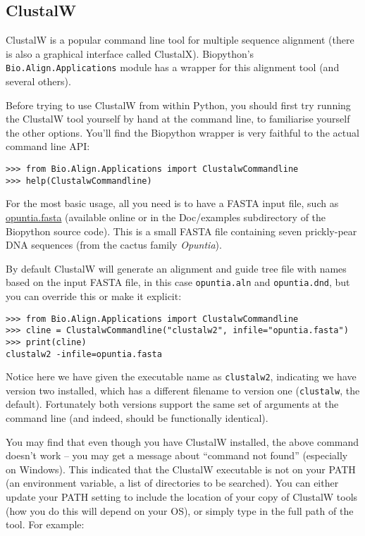\subsection{ClustalW}
\label{sec:align_clustal}
ClustalW is a popular command line tool for multiple sequence alignment
(there is also a graphical interface called ClustalX). Biopython's
\verb|Bio.Align.Applications| module has a wrapper for this alignment tool
(and several others).

Before trying to use ClustalW from within Python, you should first try running
the ClustalW tool yourself by hand at the command line, to familiarise
yourself the other options. You'll find the Biopython wrapper is very
faithful to the actual command line API:

\begin{verbatim}
>>> from Bio.Align.Applications import ClustalwCommandline
>>> help(ClustalwCommandline)
\end{verbatim}

For the most basic usage, all you need is to have a FASTA input file, such as
\href{https://raw.githubusercontent.com/biopython/biopython/master/Doc/examples/opuntia.fasta}{opuntia.fasta}
(available online or in the Doc/examples subdirectory of the Biopython source
code). This is a small FASTA file containing seven prickly-pear DNA sequences
(from the cactus family \textit{Opuntia}).

By default ClustalW will generate an alignment and guide tree file with names
based on the input FASTA file, in this case \texttt{opuntia.aln} and
\texttt{opuntia.dnd}, but you can override this or make it explicit:

\begin{verbatim}
>>> from Bio.Align.Applications import ClustalwCommandline
>>> cline = ClustalwCommandline("clustalw2", infile="opuntia.fasta")
>>> print(cline)
clustalw2 -infile=opuntia.fasta
\end{verbatim}

Notice here we have given the executable name as \texttt{clustalw2},
indicating we have version two installed, which has a different filename to
version one (\texttt{clustalw}, the default). Fortunately both versions
support the same set of arguments at the command line (and indeed, should be
functionally identical).

You may find that even though you have ClustalW installed, the above command
doesn't work -- you may get a message about ``command not found'' (especially
on Windows). This indicated that the ClustalW executable is not on your PATH
(an environment variable, a list of directories to be searched). You can
either update your PATH setting to include the location of your copy of
ClustalW tools (how you do this will depend on your OS), or simply type in
the full path of the tool. For example:

